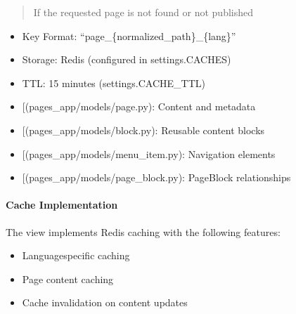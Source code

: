 \documentclass[letterpaper,10pt,english]{sphinxmanual}
\begin{document}
\begin{fulllineitems}
\begin{quote}
\begin{description}
\sphinxAtStartPar
{} \textendash{} If the requested page is not found or not published

\end{description}\end{quote}
\begin{description}
\begin{itemize}
\item {} 
\sphinxAtStartPar
Key Format: “page\_\{normalized\_path\}\_\{lang\}”

\item {} 
\sphinxAtStartPar
Storage: Redis (configured in settings.CACHES)

\item {} 
\sphinxAtStartPar
TTL: 15 minutes (settings.CACHE\_TTL)

\end{itemize}

\begin{itemize}
\item {} 
\sphinxAtStartPar
{[}\sphinxtitleref{Page}{]}(pages\_app/models/page.py): Content and metadata

\item {} 
\sphinxAtStartPar
{[}\sphinxtitleref{Block}{]}(pages\_app/models/block.py): Reusable content blocks

\item {} 
\sphinxAtStartPar
{[}\sphinxtitleref{MenuItem}{]}(pages\_app/models/menu\_item.py): Navigation elements

\item {} 
\sphinxAtStartPar
{[}\sphinxtitleref{PageBlock}{]}(pages\_app/models/page\_block.py): Page\sphinxhyphen{}Block relationships

\end{itemize}

\end{description}

\end{fulllineitems}



\paragraph{Cache Implementation}
\label{\detokenize{views/home:cache-implementation}}
\sphinxAtStartPar
The view implements Redis caching with the following features:
\begin{itemize}
\item {} 
\sphinxAtStartPar
Language\sphinxhyphen{}specific caching

\item {} 
\sphinxAtStartPar
Page content caching

\item {} 
\sphinxAtStartPar
Cache invalidation on content updates

\end{itemize}
\end{document}
